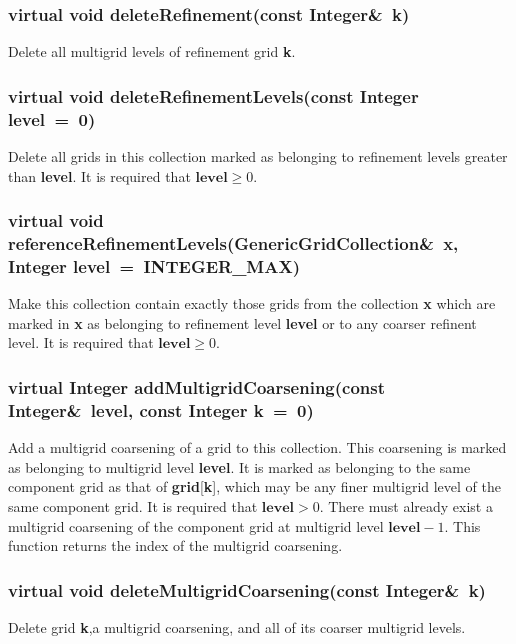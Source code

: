 \documentclass{article}
\begin{document}
  \subsubsection{virtual void deleteRefinement(const Integer\&~k)}
  \label{GenericGridCollection::deleteRefinement(k)}
    Delete all multigrid levels of refinement grid \textbf{k}.

  \subsubsection{virtual void deleteRefinementLevels(const Integer level~=~0)}
  \label{GenericGridCollection::deleteRefinementLevels(level)}
    Delete all grids in this collection marked as belonging to refinement levels greater than \textbf{level}.
    It is required that $\textbf{level}\ge0$.

  \subsubsection{virtual void referenceRefinementLevels(GenericGridCollection\&~x, 
     Integer level~=~INTEGER\_MAX)}
  \label{GenericGridCollection::referenceRefinementLevels(x,level)}
    Make this collection contain exactly those grids from the collection \textbf{x} which are marked in \textbf{x}
    as belonging to refinement level \textbf{level} or to any coarser refinent level.  It is required that
    $\textbf{level}\ge0$.

  \subsubsection{virtual Integer addMultigridCoarsening(const Integer\&~level, const Integer k~=~0)}
  \label{GenericGridCollection::addMultigridCoarsening(level,k)}
    Add a multigrid coarsening of a grid to this collection.  This coarsening is marked as belonging to multigrid level \textbf{level}.
    It is marked as belonging to the same component grid as that of \textbf{grid}[\textbf{k}], which may be any finer multigrid level
    of the same component grid.  It is required that $\textbf{level}>0$.
    There must already exist a multigrid coarsening of the component grid at multigrid level $\textbf{level}-1$.
    This function returns the index of the multigrid coarsening.

  \subsubsection{virtual void deleteMultigridCoarsening(const Integer\&~k)}
  \label{GenericGridCollection::deleteMultigridCoarsening(k)}
    Delete grid \textbf{k},a multigrid coarsening, and all of its coarser multigrid levels.
\end{document}
